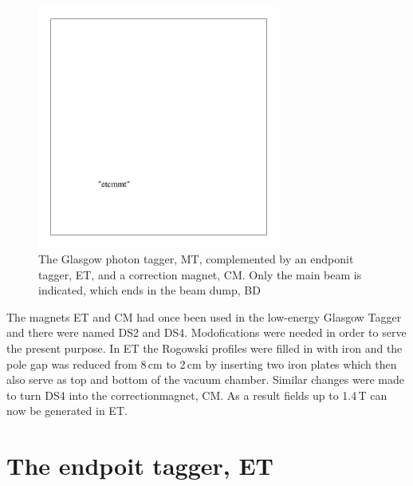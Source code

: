 \documentclass[11pt]{book}
\begin{document}
\begin{figure}
\begin{center}
\includegraphics[height=8cm]{./et_etcmmt}
\vspace*{-1cm}
\end{center}
\caption{The Glasgow photon tagger, MT, complemented by an endponit
tagger, ET, and a correction magnet, CM. Only the main beam is indicated,
which ends in the beam dump, BD}
\label{etcmmt}
\end{figure}

The magnets ET and CM had once been used in the low-energy
Glasgow Tagger \cite{lowglatag} and there were named DS2 and DS4.
Modofications were needed in order to serve
the present purpose. In ET the Rogowski profiles were filled in with iron
and the pole gap was reduced from 8\,cm to 2\,cm by inserting two iron
plates which then also serve as top and bottom of the vacuum chamber.
Similar changes were made to turn DS4 into the correctionmagnet, CM. 
As a result fields up to 1.4\,T can now be generated in ET.

\section{The endpoit tagger, ET}
\end{document}
